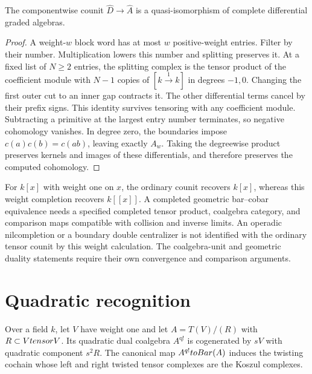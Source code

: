 \begin{theorem}
The componentwise counit $\widehat D\to\widehat A$ is a quasi-isomorphism
of complete differential graded algebras.
\end{theorem}
\begin{proof}
A weight-$w$ block word has at most $w$ positive-weight entries.
Filter by their number. Multiplication lowers this number and splitting preserves it.
At a fixed list of $N\ge2$ entries, the splitting complex is the tensor product
of the coefficient module with $N-1$ copies of $[k\xrightarrow{1}k]$ in degrees $-1,0$.
Changing the first outer cut to an inner gap contracts it.
The other differential terms cancel by their prefix signs.
This identity survives tensoring with any coefficient module.
Subtracting a primitive at the largest entry number terminates, so negative cohomology vanishes.
In degree zero, the boundaries impose $c(a)c(b)=c(ab)$,
leaving exactly $A_w$.
Taking the degreewise product preserves kernels and images of these differentials,
and therefore preserves the computed cohomology.
\end{proof}

For $k[x]$ with weight one on $x$, the ordinary counit recovers $k[x]$,
whereas this weight completion recovers $k[[x]]$.
A completed geometric bar--cobar equivalence needs a specified completed tensor product,
coalgebra category, and comparison maps compatible with collision and inverse limits.
An operadic nilcompletion or a boundary double centralizer is not identified
with the ordinary tensor counit by this weight calculation.
The coalgebra-unit and geometric duality statements require their own convergence and comparison arguments.

\section{Quadratic recognition}
Over a field $k$, let $V$ have weight one and let $A=T(V)/(R)$ with $R\subset Vtensor V$. Its quadratic dual coalgebra $A^{\mathrm{q!}}$ is cogenerated by $sV$ with quadratic component $s^2R$. The canonical map $A^{q!}toBar(A)$ induces the twisting cochain whose left and right twisted tensor complexes are the Koszul complexes.

